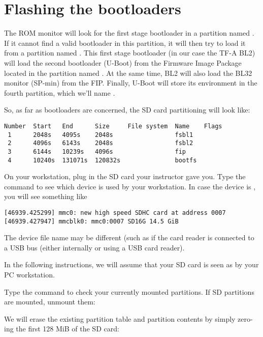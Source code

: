 \section{Flashing the bootloaders}

The ROM monitor will look for the first stage bootloader in a
partition named . If it cannot find a valid bootloader in
this partition, it will then try to load it from a partition named
. This first stage bootloader (in our case the TF-A BL2)
will load the second bootloader (U-Boot) from the Firmware Image
Package located in the partition named . At the same time,
BL2 will also load the BL32 monitor (SP-min) from the FIP. Finally,
U-Boot will store its environment in the fourth partition, which we'll
name .

So, as far as bootloaders are concerned, the SD card partitioning will
look like:

\begin{verbatim}
Number  Start   End      Size     File system  Name    Flags
 1      2048s   4095s    2048s                 fsbl1
 2      4096s   6143s    2048s                 fsbl2
 3      6144s   10239s   4096s                 fip
 4      10240s  131071s  120832s               bootfs
\end{verbatim}

On your workstation, plug in the SD card your instructor gave you. Type
the  command to see which device is used by your
workstation. In case the device is , you will see
something like

\begin{verbatim}
[46939.425299] mmc0: new high speed SDHC card at address 0007
[46939.427947] mmcblk0: mmc0:0007 SD16G 14.5 GiB
\end{verbatim}

The device file name may be different (such as 
if the card reader is connected to a USB bus (either internally
or using a USB card reader).

In the following instructions, we will assume that your SD card is
seen as  by your PC workstation.

Type the  command to check your currently mounted
partitions. If SD partitions are mounted, unmount them:


We will erase the existing partition table and partition contents
by simply zero-ing the first 128 MiB of the SD card:

